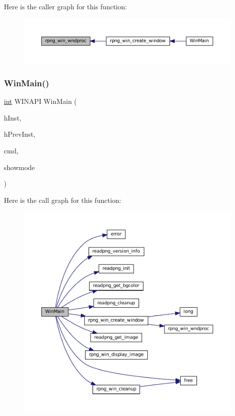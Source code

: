 Here is the caller graph for this function\+:
\nopagebreak
\begin{figure}[H]
\begin{center}
\leavevmode
\includegraphics[width=350pt]{rpng-win_8c_a1b1b264a2d9a35661c12289f38929843_icgraph}
\end{center}
\end{figure}
\mbox{\label{rpng-win_8c_a2db31d959abfda840605268cd8ba1d08}} 
\subsubsection{\texorpdfstring{Win\+Main()}{WinMain()}}
{\footnotesize\ttfamily \mbox{\hyperlink{ioapi_8h_a787fa3cf048117ba7123753c1e74fcd6}{int}} W\+I\+N\+A\+PI Win\+Main (\begin{DoxyParamCaption}\item[{H\+I\+N\+S\+T\+A\+N\+CE}]{h\+Inst,  }\item[{H\+I\+N\+S\+T\+A\+N\+CE}]{h\+Prev\+Inst,  }\item[{P\+S\+TR}]{cmd,  }\item[{\mbox{\hyperlink{ioapi_8h_a787fa3cf048117ba7123753c1e74fcd6}{int}}}]{showmode }\end{DoxyParamCaption})}

Here is the call graph for this function\+:
\nopagebreak
\begin{figure}[H]
\begin{center}
\leavevmode
\includegraphics[width=350pt]{rpng-win_8c_a2db31d959abfda840605268cd8ba1d08_cgraph}
\end{center}
\end{figure}


